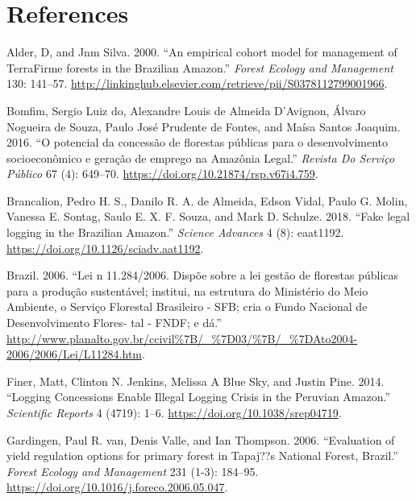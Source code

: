 \documentclass[
]{article}
\begin{document}
\hypertarget{references}{%
\section*{References}\label{references}}

\hypertarget{refs}{}
\leavevmode\hypertarget{ref-Alder2000}{}%
Alder, D, and Jnm Silva. 2000. ``An empirical cohort model for management of TerraFirme forests in the Brazilian Amazon.'' \emph{Forest Ecology and Management} 130: 141--57. \url{http://linkinghub.elsevier.com/retrieve/pii/S0378112799001966}.

\leavevmode\hypertarget{ref-Bomfim2016}{}%
Bomfim, Sergio Luiz do, Alexandre Louis de Almeida D'Avignon, Álvaro Nogueira de Souza, Paulo José Prudente de Fontes, and Maísa Santos Joaquim. 2016. ``O potencial da concessão de florestas públicas para o desenvolvimento socioeconômico e geração de emprego na Amazônia Legal.'' \emph{Revista Do Serviço Público} 67 (4): 649--70. \url{https://doi.org/10.21874/rsp.v67i4.759}.

\leavevmode\hypertarget{ref-Brancalion2018}{}%
Brancalion, Pedro H. S., Danilo R. A. de Almeida, Edson Vidal, Paulo G. Molin, Vanessa E. Sontag, Saulo E. X. F. Souza, and Mark D. Schulze. 2018. ``Fake legal logging in the Brazilian Amazon.'' \emph{Science Advances} 4 (8): eaat1192. \url{https://doi.org/10.1126/sciadv.aat1192}.

\leavevmode\hypertarget{ref-Brazil2006}{}%
Brazil. 2006. ``Lei n 11.284/2006. Dispõe sobre a lei gestão de florestas públicas para a produção sustentável; institui, na estrutura do Ministério do Meio Ambiente, o Serviço Florestal Brasileiro - SFB; cria o Fundo Nacional de Desenvolvimento Flores- tal - FNDF; e dá.'' \url{http://www.planalto.gov.br/ccivil\%7B/_\%7D03/\%7B/_\%7DAto2004-2006/2006/Lei/L11284.htm}.

\leavevmode\hypertarget{ref-Finer2014}{}%
Finer, Matt, Clinton N. Jenkins, Melissa A Blue Sky, and Justin Pine. 2014. ``Logging Concessions Enable Illegal Logging Crisis in the Peruvian Amazon.'' \emph{Scientific Reports} 4 (4719): 1--6. \url{https://doi.org/10.1038/srep04719}.

\leavevmode\hypertarget{ref-VanGardingen2006}{}%
Gardingen, Paul R. van, Denis Valle, and Ian Thompson. 2006. ``Evaluation of yield regulation options for primary forest in Tapaj??s National Forest, Brazil.'' \emph{Forest Ecology and Management} 231 (1-3): 184--95. \url{https://doi.org/10.1016/j.foreco.2006.05.047}.
\end{document}
